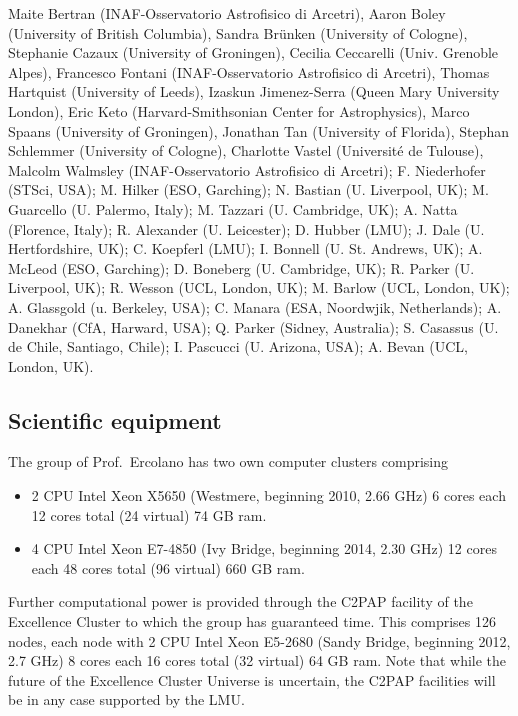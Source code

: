 \documentclass[10pt,fleqn,twoside]{article}
\begin{document}
Maite Bertran (INAF-Osservatorio Astrofisico di Arcetri), Aaron Boley (University of British Columbia), Sandra Brünken (University of Cologne), Stephanie Cazaux (University of Groningen), Cecilia Ceccarelli (Univ. Grenoble Alpes), Francesco Fontani (INAF-Osservatorio Astrofisico di Arcetri), Thomas Hartquist (University of Leeds), Izaskun Jimenez-Serra (Queen Mary University London), Eric Keto (Harvard-Smithsonian Center for Astrophysics), Marco Spaans (University of Groningen), Jonathan Tan (University of Florida), Stephan Schlemmer (University of Cologne), Charlotte Vastel (Université de Tulouse), Malcolm Walmsley (INAF-Osservatorio Astrofisico di Arcetri);
F. Niederhofer (STSci, USA); M. Hilker (ESO, Garching); N. Bastian (U. Liverpool,
UK); M. Guarcello (U. Palermo, Italy); M. Tazzari (U. Cambridge, UK);
A. Natta (Florence, Italy); R. Alexander (U. Leicester); D. Hubber
(LMU); J. Dale (U. Hertfordshire, UK); C. Koepferl (LMU); I. Bonnell
(U. St. Andrews, UK); A. McLeod (ESO, Garching); D. Boneberg
(U. Cambridge, UK); R. Parker (U. Liverpool, UK); R. Wesson (UCL,
London, UK); M. Barlow (UCL, London, UK); A. Glassgold (u. Berkeley,
USA); C. Manara (ESA, Noordwjik, Netherlands); A. Danekhar (CfA,
Harward, USA); Q. Parker (Sidney, Australia); S. Casassus
(U. de Chile, Santiago, Chile); I. Pascucci (U. Arizona, USA);
A. Bevan (UCL, London, UK).

\subsection{Scientific equipment}



The group of Prof.\ Ercolano has two own computer clusters comprising 

\begin{itemize}
\item 2 CPU Intel Xeon X5650 (Westmere, beginning
2010, 2.66 GHz) 6 cores each 12 cores total (24 virtual) 74 GB ram.

\item 4 CPU Intel Xeon E7-4850 (Ivy Bridge, beginning 2014, 2.30 GHz)
12 cores each 48 cores total (96 virtual) 660 GB ram.

\end{itemize}

Further computational power is provided through the C2PAP facility of the Excellence Cluster to which
the group has guaranteed time. This comprises 126 nodes, each node with 2 CPU Intel Xeon E5-2680 (Sandy
Bridge, beginning 2012, 2.7 GHz) 8 cores each 16 cores total (32
virtual) 64 GB ram. Note that while the future of the Excellence
Cluster Universe is uncertain, the C2PAP facilities will be in any
case supported by the LMU. 
\end{document}
